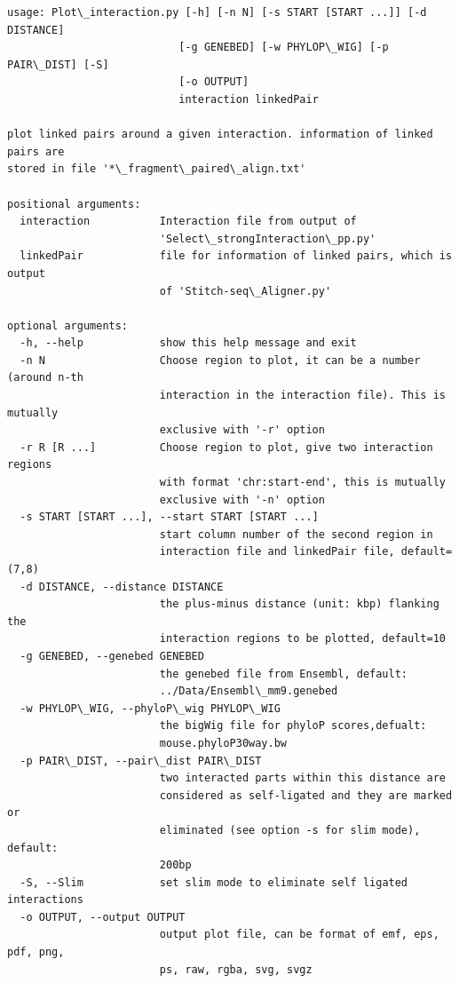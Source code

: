 \documentclass[letterpaper,10pt,english]{sphinxmanual}
\begin{document}
\begin{Verbatim}[commandchars=\\\{\}]
usage: Plot\_interaction.py [-h] [-n N] [-s START [START ...]] [-d DISTANCE]
                           [-g GENEBED] [-w PHYLOP\_WIG] [-p PAIR\_DIST] [-S]
                           [-o OUTPUT]
                           interaction linkedPair

plot linked pairs around a given interaction. information of linked pairs are
stored in file '*\_fragment\_paired\_align.txt'

positional arguments:
  interaction           Interaction file from output of
                        'Select\_strongInteraction\_pp.py'
  linkedPair            file for information of linked pairs, which is output
                        of 'Stitch-seq\_Aligner.py'

optional arguments:
  -h, --help            show this help message and exit
  -n N                  Choose region to plot, it can be a number (around n-th
                        interaction in the interaction file). This is mutually
                        exclusive with '-r' option
  -r R [R ...]          Choose region to plot, give two interaction regions
                        with format 'chr:start-end', this is mutually
                        exclusive with '-n' option
  -s START [START ...], --start START [START ...]
                        start column number of the second region in
                        interaction file and linkedPair file, default=(7,8)
  -d DISTANCE, --distance DISTANCE
                        the plus-minus distance (unit: kbp) flanking the
                        interaction regions to be plotted, default=10
  -g GENEBED, --genebed GENEBED
                        the genebed file from Ensembl, default:
                        ../Data/Ensembl\_mm9.genebed
  -w PHYLOP\_WIG, --phyloP\_wig PHYLOP\_WIG
                        the bigWig file for phyloP scores,defualt:
                        mouse.phyloP30way.bw
  -p PAIR\_DIST, --pair\_dist PAIR\_DIST
                        two interacted parts within this distance are
                        considered as self-ligated and they are marked or
                        eliminated (see option -s for slim mode), default:
                        200bp
  -S, --Slim            set slim mode to eliminate self ligated interactions
  -o OUTPUT, --output OUTPUT
                        output plot file, can be format of emf, eps, pdf, png,
                        ps, raw, rgba, svg, svgz
\end{Verbatim}
\end{document}
